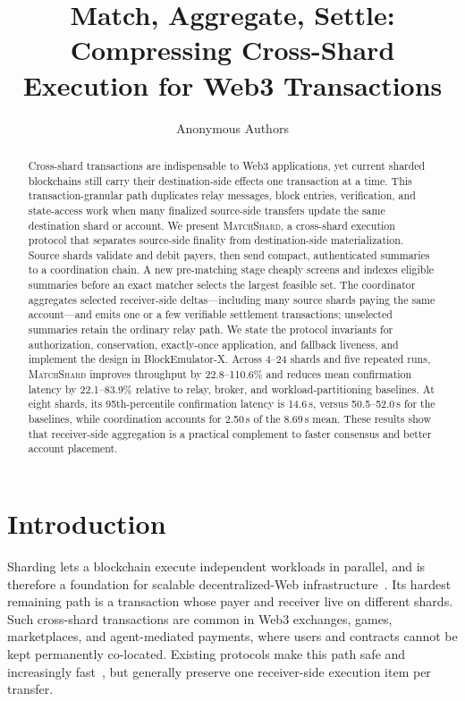 \documentclass[sigconf,anonymous,review]{acmart}
\title{Match, Aggregate, Settle: Compressing Cross-Shard Execution for Web3 Transactions}
\author{Anonymous Authors}
\newcommand{\system}{\textsc{MatchShard}\xspace}
\begin{document}
\begin{abstract}
Cross-shard transactions are indispensable to Web3 applications, yet current sharded blockchains still carry their destination-side effects one transaction at a time. This transaction-granular path duplicates relay messages, block entries, verification, and state-access work when many finalized source-side transfers update the same destination shard or account. We present \system, a cross-shard execution protocol that separates source-side finality from destination-side materialization. Source shards validate and debit payers, then send compact, authenticated summaries to a coordination chain. A new pre-matching stage cheaply screens and indexes eligible summaries before an exact matcher selects the largest feasible set. The coordinator aggregates selected receiver-side deltas---including many source shards paying the same account---and emits one or a few verifiable settlement transactions; unselected summaries retain the ordinary relay path. We state the protocol invariants for authorization, conservation, exactly-once application, and fallback liveness, and implement the design in BlockEmulator-X. Across 4--24 shards and five repeated runs, \system improves throughput by 22.8--110.6\% and reduces mean confirmation latency by 22.1--83.9\% relative to relay, broker, and workload-partitioning baselines. At eight shards, its 95th-percentile confirmation latency is 14.6\,s, versus 50.5--52.0\,s for the baselines, while coordination accounts for 2.50\,s of the 8.69\,s mean. These results show that receiver-side aggregation is a practical complement to faster consensus and better account placement.
\end{abstract}

\maketitle

\section{Introduction}

Sharding lets a blockchain execute independent workloads in parallel, and is therefore a foundation for scalable decentralized-Web infrastructure~\cite{elastico2016,omniledger2018,rapidchain2018,monoxide2019}. Its hardest remaining path is a transaction whose payer and receiver live on different shards. Such cross-shard transactions are common in Web3 exchanges, games, marketplaces, and agent-mediated payments, where users and contracts cannot be kept permanently co-located. Existing protocols make this path safe and increasingly fast~\cite{chainspace2018,rivet2020,logos2026,xrbc2026,lightcross2024,presto2024}, but generally preserve one receiver-side execution item per transfer.
\end{document}
